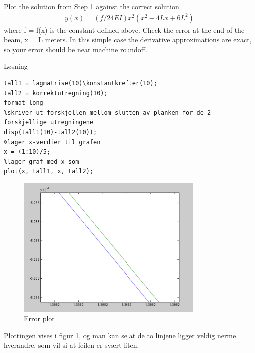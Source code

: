 % 

Plot the solution from Step 1 against the correct solution
\begin{align}
	y(x) = (f/24EI)x^2(x^2 − 4Lx + 6L^2)
\end{align}
where f = f(x) is the constant defined above.
\newline
\newline
Check the error at the end of the beam, x = L meters. In this simple case the derivative approximations are exact, so your error should be near machine roundoff.

\vspace{5mm}
Løsning

\begin{lstlisting}[caption={oppgave2.m}]
tall1 = lagmatrise(10)\konstantkrefter(10);
tall2 = korrektutregning(10);
format long
%skriver ut forskjellen mellom slutten av planken for de 2 forskjellige utregningene
disp(tall1(10)-tall2(10));
%lager x-verdier til grafen
x = (1:10)/5;
%lager graf med x som
plot(x, tall1, x, tall2); 
\end{lstlisting}

\vspace{3mm}


\begin{figure}[h]
    \centering
    \includegraphics[width=0.8\textwidth]{sections/Exercise2/errorplot2}
    \caption{Error plot}
    \label{fig:errorplot2}
\end{figure}
 
Plottingen vises i figur \ref{fig:errorplot2}, og man kan se at de to linjene ligger veldig nerme hverandre, som vil si at feilen er svært liten.


% 